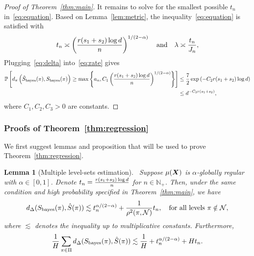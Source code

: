 \documentclass[11pt]{article}
\theoremstyle{plain}
\newtheorem{lem}{Lemma}
\theoremstyle{definition}
\def\bayesS{S_{\textup{bayes}}}
\begin{document}
\begin{proof}[Proof of Theorem~\ref{thm:main}]
It remains to solve for the smallest possible $t_n$ in~\eqref{eq:equation}. Based on Lemma~\ref{lem:metric}, the inequality~\eqref{eq:equation} is satisfied with 
\begin{equation}\label{eq:delta}
t_n\asymp  \left({r(s_1+s_2)\log d \over n}\right)^{1/(2-\alpha)} \quad \text{and}\quad \lambda \asymp {t_n\over J_n},
\end{equation}
Plugging~\eqref{eq:delta} into~\eqref{eq:rate} gives
\begin{align}\label{eq:tail}
\mathbb{P}\left[d_\pi\left(\hat S_{\text{bayes}}(\pi),\bayesS(\pi)\right)\geq  \max\left\{ a_n, C_1\left({r(s_1+s_2)\log d \over n}\right)^{1/(2-\alpha)} \right\}\right]&\leq {7\over 2}\exp\left( - C_2r(s_1+s_2)\log d \right)\notag \\
&\leq d^{-C_3r(s_1+s_2)},
\end{align}
where $C_1, C_2, C_3>0$ are constants.
\end{proof}


\subsubsection{Proofs of Theorem~\ref{thm:regression}}
We first suggest lemmas and proposition that will be used to prove Theorem~\ref{thm:regression}.
\begin{lem}[Multiple level-sets estimation]~\label{lem:main}Suppose $\mu(\bm X)$ is $\alpha$-globally regular with $\alpha\in[0,1]$. Denote $t_n={ r(s_1+s_2)\log d  \over n}$ for $n\in\mathbb{N}_{+}$. Then, under the same condition and high probability specified in Theorem~\ref{thm:main}, we have
\[
d_{\Delta}(\bayesS(\pi),\hat S(\pi))\lesssim t_n^{\alpha/(2-\alpha)}+ {1\over \rho^2(\pi,\tN)}t_n,\quad \text{for all levels }\pi \notin \tN, 
\]
where $\lesssim$ denotes the inequality up to multiplicative constants. Furthermore, 
\begin{equation}\label{eq:total}
{1\over H}\sum_{\pi \in \Pi} d_{\Delta}(\bayesS(\pi),\hat S(\pi))\lesssim   {1\over H}+t_n^{\alpha/(2-\alpha)}+ H t_n .
\end{equation}
\end{lem}
\end{document}

